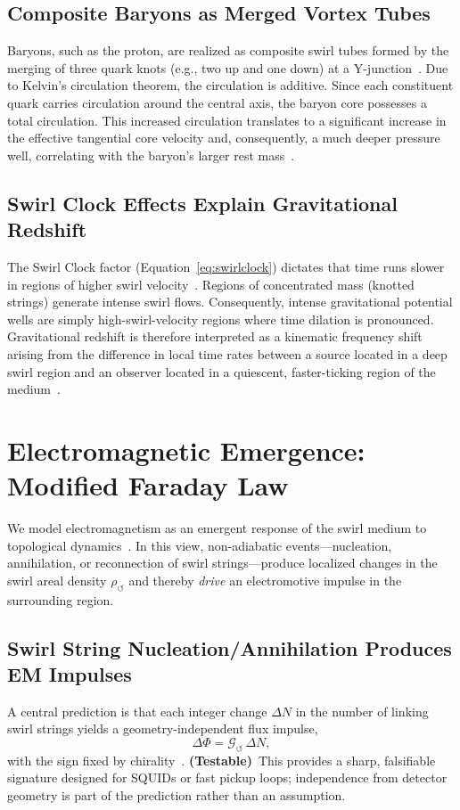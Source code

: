\documentclass[10pt,reprint,aps,onecolumn,nofootinbib]{revtex4-2}
\newcommand{\testable}{\textbf{(Testable)}}
\begin{document}
\subsection*{Composite Baryons as Merged Vortex Tubes}
    Baryons, such as the proton, are realized as composite swirl tubes formed by the merging of three quark knots (e.g., two up and one down) at a Y-junction~\cite{3}. Due to Kelvin's circulation theorem, the circulation is additive. Since each constituent quark carries circulation around the central axis, the baryon core possesses a total circulation. This increased circulation translates to a significant increase in the effective tangential core velocity and, consequently, a much deeper pressure well, correlating with the baryon's larger rest mass~\cite{3}.

\subsection*{Swirl Clock Effects Explain Gravitational Redshift}
    The Swirl Clock factor (Equation~\ref{eq:swirlclock}) dictates that time runs slower in regions of higher swirl velocity~\cite{1}. Regions of concentrated mass (knotted strings) generate intense swirl flows. Consequently, intense gravitational potential wells are simply high-swirl-velocity regions where time dilation is pronounced. Gravitational redshift is therefore interpreted as a kinematic frequency shift arising from the difference in local time rates between a source located in a deep swirl region and an observer located in a quiescent, faster-ticking region of the medium~\cite{1}.

\section{Electromagnetic Emergence: Modified Faraday Law}
\label{sec:em}
We model electromagnetism as an emergent response of the swirl medium to topological dynamics~\cite{2}. In this view, non-adiabatic events—nucleation, annihilation, or reconnection of swirl strings—produce localized changes in the swirl areal density $\rho_{\circlearrowleft}$ and thereby \emph{drive} an electromotive impulse in the surrounding region.

\subsection*{Swirl String Nucleation/Annihilation Produces EM Impulses}
    A central prediction is that each integer change $\Delta N$ in the number of linking swirl strings yields a geometry-independent flux impulse,
    \[
        \Delta\Phi = \mathcal{G}_{\circlearrowleft} \,\Delta N,
    \]
    with the sign fixed by chirality~\cite{2}. \testable\ This provides a sharp, falsifiable signature designed for SQUIDs or fast pickup loops; independence from detector geometry is part of the prediction rather than an assumption.
\end{document}
